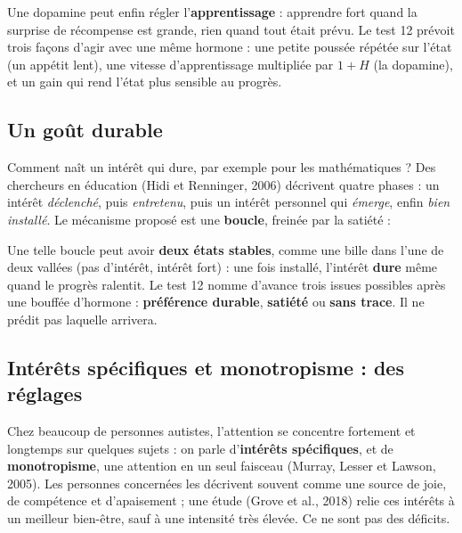 \documentclass[fontsize=10pt,paper=a4,parskip=half-]{scrartcl}
\newcommand{\q}[1]{\og #1\fg{}}
\begin{document}
Une \q{dopamine} peut enfin régler l'\textbf{apprentissage} : apprendre fort quand la
surprise de récompense est grande, rien quand tout était prévu. Le test 12 prévoit
trois façons d'agir avec une même hormone : une petite poussée
répétée sur l'état (un \q{appétit lent}), une vitesse d'apprentissage multipliée par
$1+H$ (la \q{dopamine}), et un gain qui rend l'état plus sensible au progrès.

\subsection{Un goût durable}
Comment naît un intérêt qui dure, par exemple pour les mathématiques ? Des chercheurs en
éducation (Hidi et Renninger, 2006) décrivent quatre phases : un intérêt
\emph{déclenché}, puis \emph{entretenu}, puis un intérêt personnel qui \emph{émerge}, enfin
\emph{bien installé}. Le mécanisme proposé est une \textbf{boucle}, freinée par la satiété :

\begin{center}
\end{center}

Une telle boucle peut avoir \textbf{deux états stables}, comme une bille dans l'une de
deux vallées (\q{pas d'intérêt}, \q{intérêt fort}) : une fois installé, l'intérêt
\textbf{dure} même quand le progrès ralentit. Le test 12
nomme d'avance trois issues possibles après une bouffée d'hormone :
\textbf{préférence durable}, \textbf{satiété} ou \textbf{sans trace}. Il ne prédit pas
laquelle arrivera.

\subsection{Intérêts spécifiques et monotropisme : des réglages}
Chez beaucoup de personnes autistes, l'attention se concentre fortement et longtemps sur
quelques sujets : on parle d'\textbf{intérêts spécifiques}, et de \textbf{monotropisme}, une
attention \q{en un seul faisceau} (Murray, Lesser et Lawson, 2005). Les personnes concernées
les décrivent souvent comme une source de joie, de compétence et d'apaisement ; une étude
(Grove et al., 2018) relie ces intérêts à un meilleur bien-être, sauf à une intensité très
élevée. Ce ne sont pas des déficits.
\end{document}
